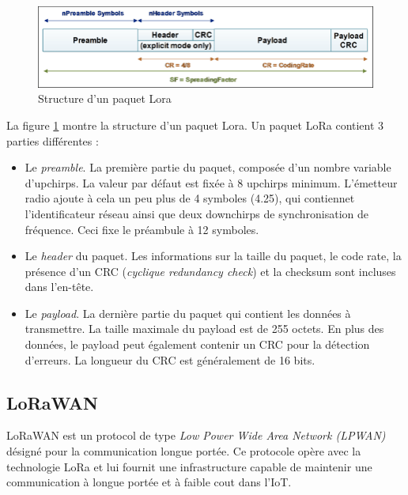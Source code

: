 \begin{figure}[h]
\centering

\includegraphics[scale=0.4]{images/lorapacket.png}
\caption{Structure d'un paquet Lora\cite{lorapacket}}\label{term6}
\end{figure}


La figure \ref{term6} montre la structure d'un paquet Lora. Un paquet LoRa contient 3 parties différentes \cite{loraphy} :

\vspace{0.1cm}

\begin{itemize}
\item Le \textit{preamble}. La première partie du paquet, composée d'un nombre variable d'upchirps. La valeur par défaut est fixée à 8 upchirps minimum. L'émetteur radio ajoute à cela un peu plus de 4 symboles (4.25), qui contiennet l'identificateur réseau ainsi que deux downchirps de synchronisation de fréquence. Ceci fixe le préambule à 12 symboles.
\item Le \textit{header} du paquet. Les informations sur la taille du paquet, le code rate, la présence d'un CRC (\textit{cyclique redundancy check}) et la checksum sont incluses dans l'en-tête.
\item Le \textit{payload}. La dernière partie du paquet qui contient les données à transmettre. La taille maximale du payload est de 255 octets. En plus des données, le payload peut également contenir un CRC pour la détection d'erreurs. La longueur du CRC est généralement de 16 bits.
\end{itemize}


\subsection{LoRaWAN}\label{lorawan}

LoRaWAN est un protocol de type \textit{Low Power Wide Area Network (LPWAN)} désigné pour la communication longue portée. Ce protocole opère avec la technologie LoRa et lui fournit une infrastructure capable de maintenir une communication à longue portée et à faible cout dans l'IoT.

